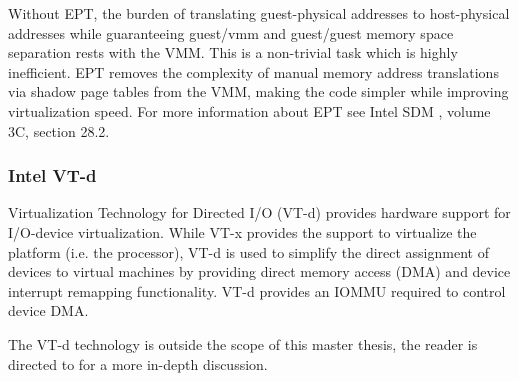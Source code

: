 Without EPT, the burden of translating guest-physical addresses to
host-physical addresses while guaranteeing guest/vmm and guest/guest memory
space separation rests with the VMM. This is a non-trivial task which is highly
inefficient. EPT removes the complexity of manual memory address translations
via shadow page tables from the VMM, making the code simpler while improving
virtualization speed. For more information about EPT see Intel SDM
\cite{IntelSDM}, volume 3C, section 28.2.

\subsubsection{Intel VT-d}\label{subsubsec:vtd}
Virtualization Technology for Directed I/O (VT-d) provides hardware
support for I/O-device virtualization. While VT-x provides the support to
virtualize the platform (i.e. the processor), VT-d is used to simplify the
direct assignment of devices to virtual machines by providing direct memory
access (DMA) and device interrupt remapping functionality. VT-d
provides an IOMMU required to control device DMA.

The VT-d technology is outside the scope of this master thesis, the reader is
directed to \cite{IntelVTd} for a more in-depth discussion.
